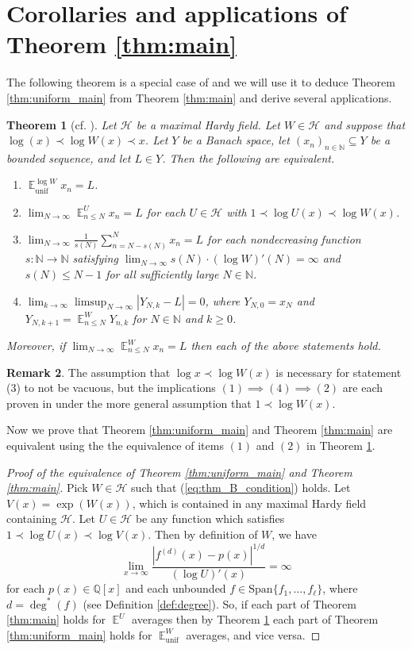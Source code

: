 \documentclass[12pt]{article}
\theoremstyle{plain} %
\newtheorem{theorem}{Theorem}[section]
\theoremstyle{definition} %
\newtheorem{remark}[theorem]{Remark}
\theoremstyle{plain}
\theoremstyle{plain}
\numberwithin{equation}{section}
\newcommand{\N}{\mathbb{N}}
\newcommand{\Q}{\mathbb{Q}}
\renewcommand{\leq}{\leqslant}
\renewcommand{\geq}{\geqslant}
\renewcommand{\subset}{\subseteq}
\newcommand{\1}{\mathbbm{1}}
\newcommand{\E}{\operatorname{\mathbb{E}}}
\newcommand{\oo}{\infty}
\newcommand{\unif}{\operatorname{unif}}
\begin{document}
\section{Corollaries and applications of Theorem \ref{thm:main}}\label{section:applications}

The following theorem is a special case of \cite[Theorem C]{reilly26} and we will use it to deduce Theorem \ref{thm:uniform_main} from Theorem \ref{thm:main} and derive several applications.
\begin{theorem}[cf. {\cite[Theorem C]{reilly26}}]\label{thm:mikey_thm}
Let $\mathcal{H}$ be a maximal Hardy field. Let $W\in \mathcal{H}$ and suppose that $\log(x)\prec  \log W(x)\prec x$. Let $Y$ be a Banach space, let $(x_n)_{n\in \N}\subset Y$ be a bounded sequence, and let $L\in Y$. Then the following are equivalent.
\begin{enumerate}[label = (\arabic*)]
\item $\E_{\text{unif}}^{\log W}x_n = L$.
\item $\lim_{N\to\oo}\E_{n\leq N}^Ux_n = L$ for each $U\in\mathcal{H}$ with $1\prec \log U(x)\prec \log W(x)$.
\item $\lim_{N\to\oo} \frac{1}{s(N)}\sum_{n=N-s(N)}^Nx_n= L$ for each nondecreasing function $s:\N\rightarrow\N$ satisfying 
$
\lim_{N\to\oo}s(N) \cdot (\log W)'(N)=\oo
$
and $s(N)\leq N-1$ for all sufficiently large $N\in \N$.
\item $\lim_{k\to\oo}\limsup_{N\to\oo}|Y_{N,k}-L|=0$, where $Y_{N,0} = x_{N}$ and $Y_{N,k+1}=\E^{W}_{n\leq N}Y_{n,k}$ for $N\in \N$ and $k\geq 0$.
\end{enumerate}
Moreover, if $\lim_{N\to\oo}\E^{W}_{n\leq N}x_n=L$ then each of the above statements hold.
\end{theorem}
\begin{remark}\label{remark:1precW}
    The assumption that $\log x\prec \log W(x)$ is necessary for statement (3) to not be vacuous, but the implications $(1)\implies (4)\implies (2)$ are each proven in \cite[Corollary 2.2, Corollary 3.3, Theorem 4.1, Theorem 5.5]{reilly26} under the more general assumption that $1\prec \log W(x)$.
\end{remark}
Now we prove that Theorem \ref{thm:uniform_main} and Theorem \ref{thm:main} are equivalent using the 
the equivalence of items $(1)$ and $(2)$ in Theorem \ref{thm:mikey_thm}. 
\begin{proof}[Proof of the equivalence of Theorem \ref{thm:uniform_main} and  Theorem \ref{thm:main}]
    Pick $W\in \mathcal{H}$ such that (\ref{eq:thm_B_condition}) holds. Let $V(x)= \exp(W(x))$, which is contained in any maximal Hardy field containing $\mathcal{H}$. Let $U\in \mathcal{H}$ be any function which satisfies $1\prec \log U(x)\prec \log V(x)$. Then by definition of $W$, we have 
    $$
    \lim_{x\to\oo}\frac{|f^{(d)}(x)-p(x)|^{1/d}}{(\log U)'(x)}=\oo
    $$
    for each $p(x)\in \Q[x]$ and each unbounded $f\in \text{Span}\{f_1,\dots, f_{\ell}\}$, where $d = \deg^*(f)$ (see Definition \ref{def:degree}). So, if each part of Theorem \ref{thm:main} holds for $\E^U$ averages then by Theorem \ref{thm:mikey_thm} each part of Theorem \ref{thm:uniform_main} holds for $\E_{\unif}^W$ averages, and vice versa.
\end{proof}
\end{document}
